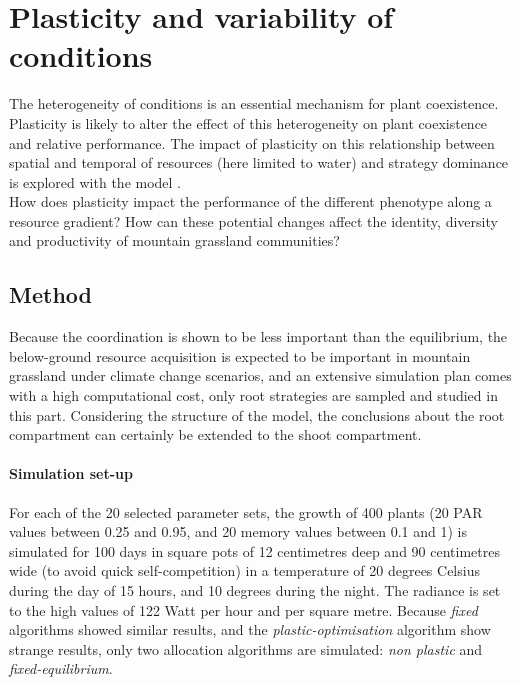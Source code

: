 \section{Plasticity and variability of conditions}
The heterogeneity of conditions is an essential mechanism for plant coexistence. Plasticity is likely to alter the effect of this heterogeneity on plant coexistence and relative performance. The impact of plasticity on this relationship between spatial and temporal  of resources (here limited to water) and strategy dominance is explored with the model \model.\\

How does plasticity impact the performance of the different phenotype along a resource gradient? How can these potential changes affect the identity, diversity and productivity of mountain grassland communities?



\subsection{Method}

Because the coordination is shown to be less important than the equilibrium, the below-ground resource acquisition is expected to be important in mountain grassland under climate change scenarios, and an extensive simulation plan comes with a high computational cost, only root strategies are sampled and studied in this part. Considering the structure of the model, the conclusions about the root compartment can certainly be extended to the shoot compartment.

\paragraph{Simulation set-up}
For each of the 20 selected parameter sets, the growth of 400 plants (20 PAR values between 0.25 and 0.95, and 20 memory values between 0.1 and 1) is simulated for 100 days in square pots of 12 centimetres deep and 90 centimetres wide (to avoid quick self-competition) in a temperature of 20 degrees Celsius during the day of 15 hours, and 10 degrees during the night. The radiance is set to the high values of 122 Watt per hour and per square metre. Because \textit{fixed} algorithms showed similar results, and the \textit{plastic-optimisation} algorithm show strange results, only two allocation algorithms are simulated: \textit{non plastic} and \textit{fixed-equilibrium}.

